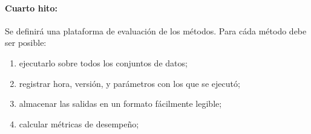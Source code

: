 \documentclass{article}
\theoremstyle{definition}
\begin{document}
\paragraph{Cuarto hito:} Se definirá una plataforma de evaluación de los métodos. Para cáda método debe ser posible: 
\begin{enumerate}
\item ejecutarlo sobre todos los conjuntos de datos; 
\item registrar hora, versión, y parámetros con los que se ejecutó;
\item almacenar las salidas en un formato fácilmente legible;
\item calcular métricas de desempeño;
\end{enumerate}

%
%
\def\indicator{\mathbf{1}}
\def\bool{\mathrm{bool}}
\def\bprod{\circ}
\def\bsum{\lor}
\def\bigand{\bigwedge}
\def\bigor{\bigvee}
\def\msum{\oplus}
\def\mprod{\otimes}
\def\mod{\mathrm{mod}}
\newcommand{\iter}[1]{^{(#1)}}
\newcommand{\st}{\ensuremath{\quad\mathrm{s.t.}\quad}}
\newcommand{\norm}[1]{\ensuremath{\left\|#1\right\|}}
\newcommand{\support}[1]{\mathrm{supp}(#1)}
\newcommand{\rankf}[1]{\mathrm{rank}(#1)}
\def\rank{\mathrm{rank}}
\newcommand{\fun}[1]{\mathrm{#1}}
\newcommand{\abs}[1]{\ensuremath{\left|#1\right|}}
\newcommand{\setdef}[1]{\ensuremath{\left\{#1\right\}}}
\newcommand{\setspan}{\ensuremath{\mathrm{span}}}
\newcommand{\svec}[1]{_{[#1]}}
\newcommand{\col}[1]{_{#1}}
\newcommand{\row}[1]{^{#1}}
\newcommand{\havg}[1]{\langle\!\langle{#1}\rangle\!\rangle}
%



\balance
\end{document}
